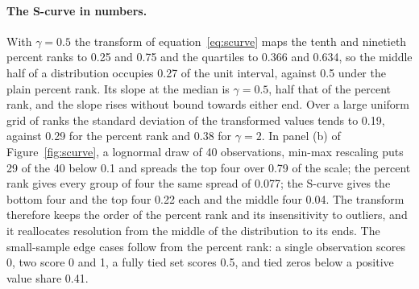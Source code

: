 
\paragraph{The S-curve in numbers.} With $\gamma=0.5$ the transform of
equation~\eqref{eq:scurve} maps the tenth and ninetieth percent ranks to 0.25 and 0.75 and the
quartiles to 0.366 and 0.634, so the middle half of a distribution occupies 0.27 of the unit
interval, against 0.5 under the plain percent rank. Its slope at the median is $\gamma=0.5$, half
that of the percent rank, and the slope rises without bound towards either end. Over a large
uniform grid of ranks the standard deviation of the transformed values tends to 0.19, against
0.29 for the percent rank and 0.38 for $\gamma=2$. In panel (b) of Figure~\ref{fig:scurve}, a
lognormal draw of 40 observations, min-max rescaling puts 29 of the 40 below 0.1 and spreads the
top four over 0.79 of the scale; the percent rank gives every group of four the same spread of
0.077; the S-curve gives the bottom four and the top four 0.22 each and the middle four 0.04.
The transform therefore keeps the order of the percent rank and its insensitivity to outliers,
and it reallocates resolution from the middle of the distribution to its ends. The small-sample
edge cases follow from the percent rank: a single observation scores 0, two score 0 and 1, a
fully tied set scores 0.5, and tied zeros below a positive value share 0.41.

